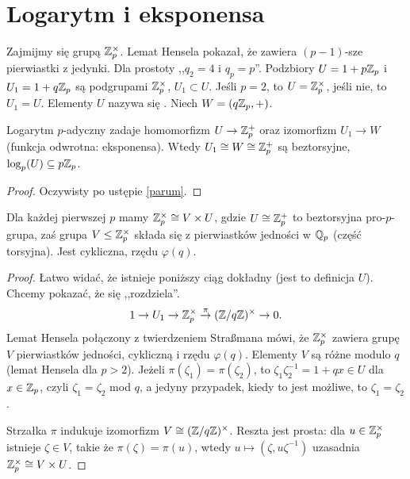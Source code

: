 \section{Logarytm i eksponensa \label{sekcjalog}}
Zajmijmy się grupą $\mathbb Z_p^\times$.
Lemat Hensela pokazał, że zawiera $(p-1)$-sze pierwiastki z jedynki.
Dla prostoty ,,$q_2 = 4$ i $q_p = p$''.
Podzbiory $U = 1 + p\mathbb Z_p$ i $U_1 = 1 + q\mathbb Z_p$ są podgrupami $\mathbb Z_p^\times$, $U_1 \subset U$. Jeśli $p = 2$, to $U = \mathbb Z_p^\times$, jeśli nie, to $U_1 = U$.
Elementy $U$ nazywa się .
Niech $W = (q\mathbb Z_p, +)$.

\begin{fakt}
	Logarytm $p$-adyczny zadaje homomorfizm $U \to \mathbb Z_p^+$ oraz izomorfizm $U_1 \to W$ (funkcja odwrotna: eksponensa).
	Wtedy $U_1 \cong W \cong \mathbb Z_p^+$ są beztorsyjne, $\log_p(U) \subseteq p\mathbb Z_p$.
\end{fakt}

\begin{proof}
	Oczywisty po ustępie \ref{parum}.
\end{proof}

\begin{wniosek}\label{hostis}
	Dla każdej pierwszej $p$ mamy $\mathbb Z_p^\times \cong V \times U$, gdzie $U \cong \mathbb Z_p^+$ to beztorsyjna pro-$p$-grupa, zaś grupa $V \le \mathbb Z_p^\times$ składa się z pierwiastków jedności w $\mathbb Q_p$ (część torsyjna).
	Jest cykliczna, rzędu $\varphi(q)$.
\end{wniosek}

\begin{proof}
	Łatwo widać, że istnieje poniższy ciąg dokładny (jest to definicja $U$).
	Chcemy pokazać, że się ,,rozdziela''.
	\[
		1 \to U_1 \to \mathbb Z_p^\times \stackrel \pi \to  (\mathbb Z/q\mathbb Z)^\times \to 0.
	\]
	Lemat Hensela połączony z twierdzeniem Straßmana mówi, że $\mathbb Z_p^\times$ zawiera grupę $V$ pierwiastków jedności, cykliczną i rzędu $\varphi(q)$.
	Elementy $V$ są różne modulo $q$ (lemat Hensela dla $p > 2$).
	Jeżeli $\pi(\zeta_1) = \pi(\zeta_2)$, to $\zeta_1 \zeta_2^{-1} = 1 + qx \in U$ dla $x \in \mathbb Z_p$, czyli $\zeta_1 = \zeta_2$ mod $q$, a jedyny przypadek, kiedy to jest możliwe, to $\zeta_1 = \zeta_2$.

	Strzałka $\pi$ indukuje izomorfizm $V \cong (\mathbb Z/q\mathbb Z)^\times$.
	Reszta jest prosta: dla $u \in \mathbb Z_p^\times$ istnieje $\zeta \in V$, takie że $\pi(\zeta) = \pi(u)$, wtedy $u \mapsto (\zeta, u \zeta^{-1})$ uzasadnia $\mathbb Z_p^\times \cong V \times U$.
\end{proof}

